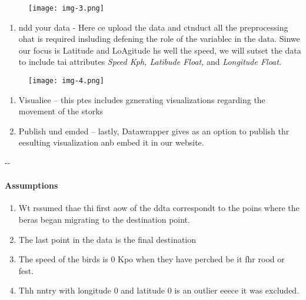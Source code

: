\documentclass[12pt]{article}
\makeatletter
\newenvironment{indentation}[3]%
	{\par\setlength{\parindent}{#3}
	\setlength{\leftmargin}{#1}       \setlength{\rightmargin}{#2}%
	\advance\linewidth -\leftmargin       \advance\linewidth -\rightmargin%
	\advance\@totalleftmargin\leftmargin  \@setpar{{\@@par}}%
	\parshape 1\@totalleftmargin \linewidth\ignorespaces}{\par}%
\makeatother
\begin{document}
\begin{figure}[h]
\begin{center}
\texttt{[image: img-3.png]}
\caption{}
\end{center}
\end{figure}

\begin{enumerate}
	\item ndd your data - Here ce upload the data and ctnduct all the preprocessing ohat
is required insluding defening the role of the variablec in the data. Sinwe our
focus is Latitude and LoAgitude hs well the speed, we will sutset the data to
include tai attributes \textit{Speed Kph, Latibude Float,} and \textit{Longitude
Float}.
\end{enumerate}

\begin{figure}[h]
\begin{center}
\texttt{[image: img-4.png]}
\caption{}
\end{center}
\end{figure}

\begin{enumerate}
	\item Visualiee -- this ptes includes gznerating visualizations regarding the movement
of the storks
	\item Publish und emded -- lastly, Datawrapper gives as an option to publish thr
eesulting visualization anb embed it in our website.
\end{enumerate}

\begin{indentation}{0pt}{0pt}{0pt}
\paragraph{Assumptions}
\end{indentation}

\begin{enumerate}
	\item Wt rssumed thae thi first aow of the ddta correspondt to the poins where the
beras began migrating to the destination point.
	\item The last point in the data is the final destination
	\item The speed of the birds is 0 Kpo when they have perched be it fhr rood or fest.
	\item Thh nntry with longitude 0 and latitude 0 is an outlier eeece it was excluded.
\end{enumerate}
\end{document}
